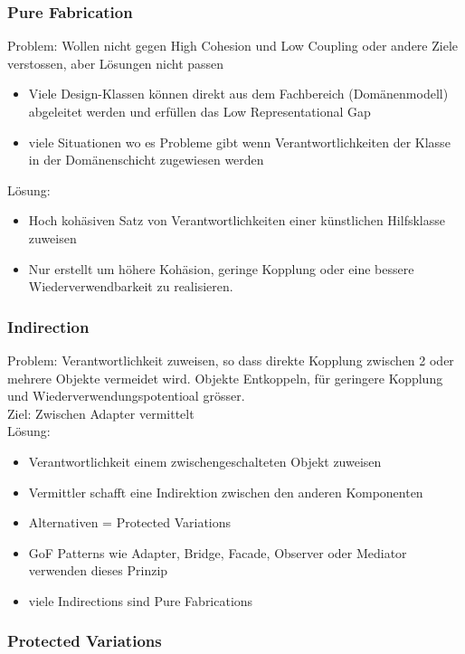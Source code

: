 \documentclass[../ZF_SWEN1.tex]{subfiles}
\begin{document}
\subsubsection{Pure Fabrication}
Problem: Wollen nicht gegen High Cohesion und Low Coupling oder andere Ziele verstossen, aber Lösungen nicht passen
\begin{itemize}
	\item Viele Design-Klassen können direkt aus dem Fachbereich (Domänenmodell) abgeleitet werden und erfüllen das Low Representational Gap
	\item viele Situationen wo es Probleme gibt wenn Verantwortlichkeiten der Klasse in der Domänenschicht zugewiesen werden
\end{itemize}

Lösung:\\
\begin{itemize}
	\item Hoch kohäsiven Satz von Verantwortlichkeiten einer künstlichen Hilfsklasse zuweisen
	\item Nur erstellt um höhere Kohäsion, geringe Kopplung oder eine bessere Wiederverwendbarkeit zu realisieren.
\end{itemize}



\subsubsection{Indirection}
Problem: Verantwortlichkeit zuweisen, so dass direkte Kopplung zwischen 2 oder mehrere Objekte vermeidet wird. Objekte Entkoppeln, für geringere Kopplung und Wiederverwendungspotentioal grösser.\\
Ziel: Zwischen Adapter vermittelt\\
Lösung:\\
\begin{itemize}
	\item Verantwortlichkeit einem zwischengeschalteten Objekt zuweisen
	\item Vermittler schafft eine Indirektion zwischen den anderen Komponenten
	\item Alternativen = Protected Variations
	\item GoF Patterns wie Adapter, Bridge, Facade, Observer oder Mediator verwenden dieses Prinzip
	\item viele Indirections sind Pure Fabrications
\end{itemize}

\subsubsection{Protected Variations}
\end{document}
